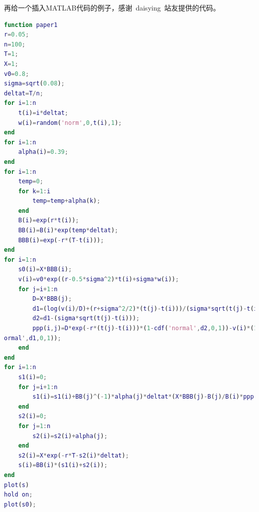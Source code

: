 再给一个插入MATLAB代码的例子，感谢~daisying~站友提供的代码。

\begin{lstlisting}[language={matlab}, caption={一段MATLAB源代码}]
function paper1
r=0.05;
n=100;
T=1;
X=1;
v0=0.8;
sigma=sqrt(0.08);
deltat=T/n;
for i=1:n
    t(i)=i*deltat;
    w(i)=random('norm',0,t(i),1);
end
for i=1:n
    alpha(i)=0.39;
end
for i=1:n
    temp=0;
    for k=1:i
        temp=temp+alpha(k);
    end
    B(i)=exp(r*t(i));
    BB(i)=B(i)*exp(temp*deltat);
    BBB(i)=exp(-r*(T-t(i)));
end
for i=1:n
    s0(i)=X*BBB(i);
    v(i)=v0*exp((r-0.5*sigma^2)*t(i)+sigma*w(i));
    for j=i+1:n
        D=X*BBB(j);
        d1=(log(v(i)/D)+(r+sigma^2/2)*(t(j)-t(i)))/(sigma*sqrt(t(j)-t(i)));
        d2=d1-(sigma*sqrt(t(j)-t(i)));
        ppp(i,j)=D*exp(-r*(t(j)-t(i)))*(1-cdf('normal',d2,0,1))-v(i)*(1-cdf('n
ormal',d1,0,1));
    end
end
for i=1:n
    s1(i)=0;
    for j=i+1:n
        s1(i)=s1(i)+BB(j)^(-1)*alpha(j)*deltat*(X*BBB(j)-B(j)/B(i)*ppp(i,j));
    end
    s2(i)=0;
    for j=1:n
        s2(i)=s2(i)+alpha(j);
    end
    s2(i)=X*exp(-r*T-s2(i)*deltat);
    s(i)=BB(i)*(s1(i)+s2(i));
end
plot(s)
hold on;
plot(s0);
\end{lstlisting}

